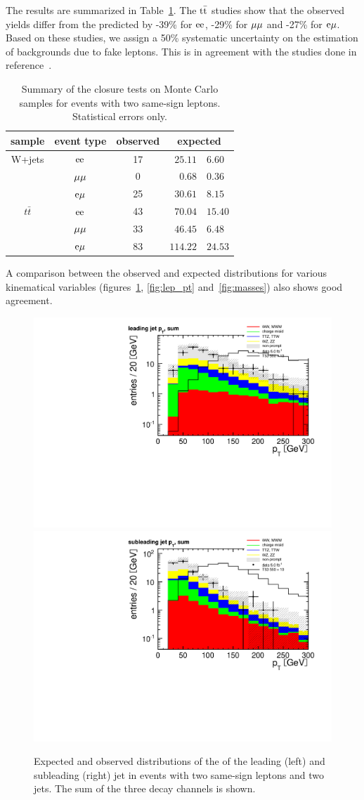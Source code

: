 The results are summarized in Table~\ref{tab:ClosureTestsTable}. The $\mathrm{t}\bar{\mathrm{t}}$ studies show that the observed yields differ
from the predicted by -39\% for $\mathrm{e}\mathrm{e}$, -29\% for $\mu\mu$ and -27\% for
$\mathrm{e}\mu$. Based on these studies, we assign a 50\% systematic
uncertainty on the estimation of backgrounds due to fake leptons. This is in agreement with the studies done in 
reference~\cite{Chatrchyan:2011wba}.

\begin{table}
\centering
\begin{tabular}{ccc r@{$\pm$}l}
    \toprule
 sample & event type & observed & \multicolumn{2}{c}{expected}  \\ 
 \midrule
W+jets  & $\mathrm{e}\mathrm{e}$ & 17 & $25.11$ & $6.60$\\ %
  & $\mu\mu$ & 0 & $0.68$ & $ 0.36$\\
  & $\mathrm{e}\mu$ & 25 & $30.61$ & $8.15$ \\
  \midrule
$t\bar t$  & $\mathrm{e}\mathrm{e}$ & 43 & $70.04$ & $15.40$  \\ %
  & $\mu\mu$ & 33 & $46.45$ & $6.48$ \\ 
  & $\mathrm{e}\mu$ & 83 & $114.22$ & $24.53$ \\
  \bottomrule
 \end{tabular}
 \caption{Summary of the closure tests on Monte Carlo samples for events
 with two same-sign leptons. Statistical errors only.} 
 \label{tab:ClosureTestsTable} 
\end{table} 

A comparison between the observed and expected distributions for various
kinematical variables (figures~\ref{fig:jet_pt}, \ref{fig:lep_pt}
and~\ref{fig:masses}) also shows good agreement.

\begin{figure}[htb]
    \centering
    \includegraphics[width=.49\textwidth]{images/pdf/same-sign,_2_jets/jet_pt_1_sum_1}
    \includegraphics[width=.49\textwidth]{images/pdf/same-sign,_2_jets/jet_pt_2_sum_1}
    \caption{Expected and observed distributions of the \pt of the leading
    (left) and subleading (right) jet in events with two same-sign leptons
and two jets. The sum of the three decay channels is shown. }
    \label{fig:jet_pt}
\end{figure}

